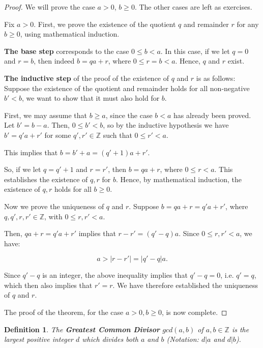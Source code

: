 \documentclass[a4paper,12pt]{report}
\newcommand{\abs}[1]{\left|#1\right|}
\newcounter{statement}
\numberwithin{statement}{chapter}
\newtheorem{defn}[statement]{Definition}
\numberwithin{equation}{chapter}
\numberwithin{section}{chapter}
\numberwithin{subsection}{section}
\begin{document}
\begin{proof}

We will prove the case $a > 0$, $b \geq 0$.  The other cases are left as exercises.


Fix $a > 0$.
First, we prove the existence of the quotient $q$ and remainder $r$ for any $b \geq 0$,
using mathematical induction.


 {\bf The base step}  corresponds to the case $0 \leq b < a$.
In this case, if we let $q = 0$ and $r = b$, then indeed $b = qa + r$,
where $0 \leq r  = b < a$.  Hence, $q$ and $r$ exist.


 {\bf The inductive step}  of the proof of the existence of $q$ and $r$ is as follows:
Suppose the existence of the quotient and remainder holds for all non-negative $b' < b$,
we want to show that it must also hold for $b$.


First, we may assume that
$b \geq a$, since the case $b < a$ has already been proved.  Let $b' = b - a$.
Then, $0 \leq b' < b$,
so by the inductive hypothesis we have $b' = q'a + r'$
for some $q', r' \in \mathbb{Z}$ such that $0 \leq r' < a$.


This implies that $b = b' + a = (q' + 1)a + r'$.


So, if we let $q = q'+ 1$
and $r = r'$, then $b = qa + r$, where $0 \leq r < a$.
This establishes the existence of $q, r$ for $b$.
Hence, by mathematical induction, the existence of $q, r$ holds for all $b \geq 0$.


Now we prove the uniqueness of $q$ and $r$.
Suppose $b = qa + r = q'a + r'$, where $q, q', r, r' \in \mathbb{Z}$,
with $0 \leq r, r' < a$.


Then, $qa+ r = q'a+r'$ implies that $r - r' = (q' - q)a$.
Since $0 \leq r, r' < a$, we have:


\[
a > \abs{r - r'} = \abs{q' - q} a.
\]


Since $q' - q$ is an integer, the above inequality implies that $q'  - q = 0$,
i.e. $q' = q$, which then also implies that $r' = r$.
We have therefore established the uniqueness of $q$ and $r$.



The proof of the theorem, for the case $a > 0, b \geq 0$, is now complete.


\end{proof}







\begin{defn}
The  {\bf Greatest Common Divisor}  $gcd(a, b)$ of $a, b \in \mathbb{Z}$ is the largest positive integer
$d$ which divides both $a$ and $b$ (Notation: $d | a$ and $d | b$).
\end{defn}
\end{document}
